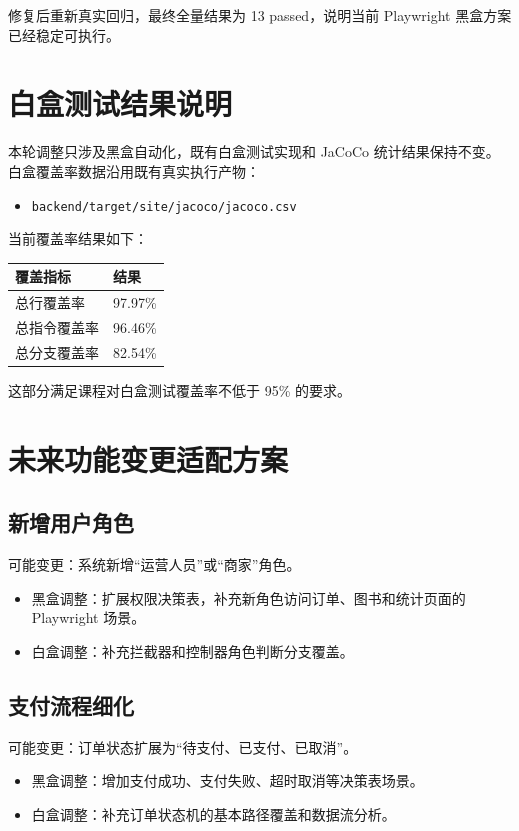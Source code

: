 \documentclass[UTF8,a4paper,12pt]{ctexart}
\begin{document}
修复后重新真实回归，最终全量结果为 13 passed，说明当前 Playwright 黑盒方案已经稳定可执行。

\section{白盒测试结果说明}

本轮调整只涉及黑盒自动化，既有白盒测试实现和 JaCoCo 统计结果保持不变。白盒覆盖率数据沿用既有真实执行产物：

\begin{itemize}
  \item \texttt{backend/target/site/jacoco/jacoco.csv}
\end{itemize}

当前覆盖率结果如下：

\begin{longtable}{p{6cm}p{6cm}}
\toprule
覆盖指标 & 结果 \\
\midrule
总行覆盖率 & 97.97\% \\
总指令覆盖率 & 96.46\% \\
总分支覆盖率 & 82.54\% \\
\bottomrule
\end{longtable}

这部分满足课程对白盒测试覆盖率不低于 95\% 的要求。

\section{未来功能变更适配方案}

\subsection{新增用户角色}

可能变更：系统新增“运营人员”或“商家”角色。

\begin{itemize}
  \item 黑盒调整：扩展权限决策表，补充新角色访问订单、图书和统计页面的 Playwright 场景。
  \item 白盒调整：补充拦截器和控制器角色判断分支覆盖。
\end{itemize}

\subsection{支付流程细化}

可能变更：订单状态扩展为“待支付、已支付、已取消”。

\begin{itemize}
  \item 黑盒调整：增加支付成功、支付失败、超时取消等决策表场景。
  \item 白盒调整：补充订单状态机的基本路径覆盖和数据流分析。
\end{itemize}
\end{document}
